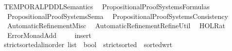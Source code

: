 %
\begin{isabellebody}%
%
%
\isadelimdocument
%
\endisadelimdocument
%
\isatagdocument
%
\isamarkuptrue%
%
\endisatagdocument
{\isafolddocument}%
%
\isadelimdocument
%
\endisadelimdocument
%
\isadelimtheory
%
\endisadelimtheory
%
\isatagtheory
{}\isamarkupfalse%
\ TEMPORAL{\isacharunderscore}{\kern0pt}PDDL{\isacharunderscore}{\kern0pt}Semantics\isanewline
{}\isanewline
\ \ {\isachardoublequoteopen}Propositional{\isacharunderscore}{\kern0pt}Proof{\isacharunderscore}{\kern0pt}Systems{\isachardot}{\kern0pt}Formulas{\isachardoublequoteclose}\isanewline
\ \ {\isachardoublequoteopen}Propositional{\isacharunderscore}{\kern0pt}Proof{\isacharunderscore}{\kern0pt}Systems{\isachardot}{\kern0pt}Sema{\isachardoublequoteclose}\isanewline
\ \ {\isachardoublequoteopen}Propositional{\isacharunderscore}{\kern0pt}Proof{\isacharunderscore}{\kern0pt}Systems{\isachardot}{\kern0pt}Consistency{\isachardoublequoteclose}\isanewline
\ \ {\isachardoublequoteopen}Automatic{\isacharunderscore}{\kern0pt}Refinement{\isachardot}{\kern0pt}Misc{\isachardoublequoteclose}\isanewline
\ \ {\isachardoublequoteopen}Automatic{\isacharunderscore}{\kern0pt}Refinement{\isachardot}{\kern0pt}Refine{\isacharunderscore}{\kern0pt}Util{\isachardoublequoteclose}\isanewline
\ \ {\isachardoublequoteopen}HOL{\isachardot}{\kern0pt}Rat{\isachardoublequoteclose}\isanewline
\ \ Error{\isacharunderscore}{\kern0pt}Monad{\isacharunderscore}{\kern0pt}Add\isanewline
\ \ \ \isanewline
{}%
\endisatagtheory
{\isafoldtheory}%
%
\isadelimtheory
\isanewline
%
\endisadelimtheory
{}\isamarkupfalse%
\ insert\ {\isacharparenleft}{\kern0pt}{\isachardoublequoteopen}{\isacharunderscore}{\kern0pt}\ {\isasymtriangleright}\ {\isacharunderscore}{\kern0pt}{\isachardoublequoteclose}\ {\isacharbrackleft}{\kern0pt}{}{}{\isacharcomma}{\kern0pt}{}{}{\isacharbrackright}{\kern0pt}\ {}{}{\isacharparenright}{\kern0pt}%
\isadelimdocument
%
\endisadelimdocument
%
\isatagdocument
%
\isamarkuptrue%
%
\endisatagdocument
{\isafolddocument}%
%
\isadelimdocument
%
\endisadelimdocument
{}\isamarkupfalse%
\ strict{\isacharunderscore}{\kern0pt}sorted{\isacharcolon}{\kern0pt}{\isacharcolon}{\kern0pt}{\isachardoublequoteopen}{\isacharprime}{\kern0pt}a{\isacharcolon}{\kern0pt}{\isacharcolon}{\kern0pt}{\isacharbraceleft}{\kern0pt}linorder{\isacharbraceright}{\kern0pt}\ list\ {\isasymRightarrow}\ bool{\isachardoublequoteclose}\ \ {\isachardoublequoteopen}strict{\isacharunderscore}{\kern0pt}sorted\ {\isasymequiv}\ sorted{\isacharunderscore}{\kern0pt}wrt\ {\isacharparenleft}{\kern0pt}{\isacharless}{\kern0pt}{\isacharparenright}{\kern0pt}{\isachardoublequoteclose}\isanewline

\end{isabellebody}
